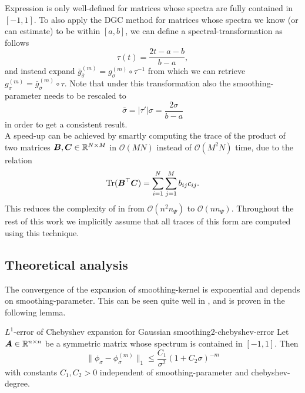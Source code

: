 Expression  is only well-defined for matrices whose spectra are fully
contained in $[-1, 1]$. To also apply the \gls{DGC} method for matrices whose
spectra we know (or can estimate) to be within $[a, b]$, we can define a
\gls{spectral-transformation} as follows
\begin{equation}
    \tau(t) = \frac{2t - a - b}{b - a},
    \label{equ:2-chebyshev-spectral-transformation}
\end{equation}
and instead expand $\bar{g}_{\bar{\sigma}}^{(m)} = g_{\sigma}^{(m)} \circ \tau^{-1}$ 
from which we can retrieve $g_{\sigma}^{(m)} = \bar{g}_{\bar{\sigma}}^{(m)} \circ \tau$.
Note that under this transformation also the \gls{smoothing-parameter} needs to be
rescaled to
\begin{equation}
    \bar{\sigma} = |\tau'| \sigma = \frac{2\sigma}{b - a}
    \label{equ:2-chebyshev-sigma-transformation}
\end{equation}
in order to get a consistent result.\\

A speed-up can be achieved by smartly computing the trace of the 
product of two matrices $\boldsymbol{B}, \boldsymbol{C} \in \mathbb{R}^{N \times M}$ in
$\mathcal{O}(MN)$ instead of $\mathcal{O}(M^2N)$ time, due to the relation
\begin{equation}
    \operatorname{Tr}(\boldsymbol{B}^{\top}\boldsymbol{C}) = \sum_{i=1}^{N} \sum_{j=1}^{M} b_{ij} c_{ij}.
    \label{equ:2-chebyshev-fast-trace}
\end{equation}
This reduces the complexity of 
in  from $\mathcal{O}(n^2n_{\Psi})$ to $\mathcal{O}(nn_{\Psi})$.
Throughout the rest of this work we implicitly assume that all traces of this
form are computed using this technique.

\subsection{Theoretical analysis}
\label{subsec:2-chebyshev-theoretical-analysis}

The convergence of the expansion of \gls{smoothing-kernel} is exponential
and depends on \gls{smoothing-parameter}. This can be seen quite well
in , and is proven in the following
lemma.

\begin{lemma}{$L^1$-error of Chebyshev expansion for Gaussian smoothing}{2-chebyshev-error}
    Let $\boldsymbol{A} \in \mathbb{R}^{n \times n}$ be a symmetric matrix whose spectrum
    is contained in $[-1, 1]$. Then
    \begin{equation}
        \lVert  \phi_{\sigma} - \phi_{\sigma}^{(m)} \rVert _1 \leq \frac{C_1}{\sigma^2}(1 + C_2 \sigma)^{-m}
        \label{equ:2-chebyshev-interpolation-error}
    \end{equation}
    with constants $C_1, C_2 > 0$ independent of \gls{smoothing-parameter} and \gls{chebyshev-degree}.
\end{lemma}

